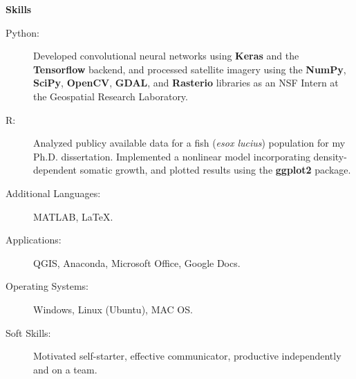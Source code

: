 \documentclass[letterpaper,11pt]{article}
\newcommand{\resheading}[1]{{\large \colorbox{mygrey}{\begin{minipage}{\textwidth}{\textbf{#1 \vphantom{p\^{E}}}}\end{minipage}}}}
\begin{document}
\resheading{Skills}
	\begin{description}
        \item[Python:] { \footnotesize Developed convolutional neural networks using \textbf{Keras} and  the \textbf{Tensorflow} backend, and processed satellite imagery using the \textbf{NumPy}, \textbf{SciPy}, \textbf{OpenCV}, \textbf{GDAL}, and \textbf{Rasterio} libraries as an NSF Intern at the Geospatial Research Laboratory.}
        
        \item[R:] { \footnotesize Analyzed publicy available data for a fish (\emph{esox lucius}) population for my Ph.D. dissertation. Implemented a nonlinear model incorporating density-dependent somatic growth, and plotted results using the \textbf{ggplot2} package.}
        	
		\item[Additional Languages:] {\footnotesize MATLAB, \LaTeX.}
		
		\item[Applications:]{\footnotesize QGIS, Anaconda, Microsoft Office, Google Docs.}
		
        \item[Operating Systems:] {\footnotesize Windows, Linux  (Ubuntu), MAC OS}.
        
        \item[Soft Skills:] {\footnotesize Motivated self-starter, effective communicator, productive independently and on a team.}
	\end{description}
\end{document}
